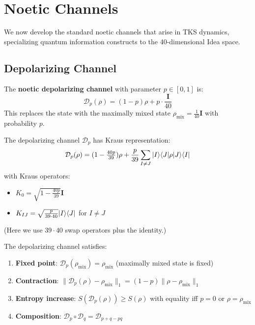 \section{Noetic Channels}
\label{sec:noetic-channels}

We now develop the standard noetic channels that arise in TKS dynamics, specializing quantum information constructs to the 40-dimensional Idea space.

\subsection{Depolarizing Channel}

\begin{definition}
\label{def:depolarizing}
The \textbf{noetic depolarizing channel} with parameter $p \in [0,1]$ is:
\[
\mathcal{D}_p(\rho) = (1-p) \rho + p \cdot \frac{\mathbf{I}}{40}
\]
This replaces the state with the maximally mixed state $\rho_{\mathrm{mix}} = \frac{1}{40}\mathbf{I}$ with probability $p$.
\end{definition}

\begin{proposition}
\label{prop:depolarizing-kraus}
The depolarizing channel $\mathcal{D}_p$ has Kraus representation:
\[
\mathcal{D}_p(\rho) = (1 - \tfrac{40p}{39}) \rho + \frac{p}{39} \sum_{I \neq J} |I\rangle\langle J| \rho |J\rangle\langle I|
\]
with Kraus operators:
\begin{itemize}
  \item $K_0 = \sqrt{1 - \frac{40p}{39}} \mathbf{I}$
  \item $K_{IJ} = \sqrt{\frac{p}{39 \cdot 40}} |I\rangle\langle J|$ for $I \neq J$
\end{itemize}
(Here we use $39 \cdot 40$ swap operators plus the identity.)
\end{proposition}

\begin{proposition}
\label{prop:depolarizing-properties}
The depolarizing channel satisfies:
\begin{enumerate}
  \item \textbf{Fixed point}: $\mathcal{D}_p(\rho_{\mathrm{mix}}) = \rho_{\mathrm{mix}}$ (maximally mixed state is fixed)
  \item \textbf{Contraction}: $\|\mathcal{D}_p(\rho) - \rho_{\mathrm{mix}}\|_1 = (1-p)\|\rho - \rho_{\mathrm{mix}}\|_1$
  \item \textbf{Entropy increase}: $S(\mathcal{D}_p(\rho)) \geq S(\rho)$ with equality iff $p = 0$ or $\rho = \rho_{\mathrm{mix}}$
  \item \textbf{Composition}: $\mathcal{D}_p \circ \mathcal{D}_q = \mathcal{D}_{p + q - pq}$
\end{enumerate}
\end{proposition}

